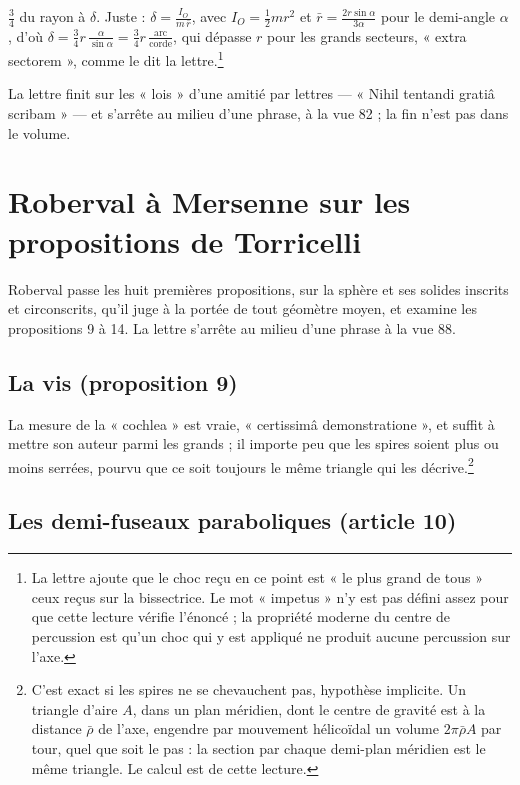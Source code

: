\documentclass[11pt,a4paper]{article}
\begin{document}
\begin{itemize}
    $\tfrac34$ du rayon à $\delta$. Juste : $\delta = \frac{I_O}{m\,\bar r}$, avec
    $I_O = \tfrac12 mr^2$ et $\bar r = \frac{2r\sin\alpha}{3\alpha}$ pour le
    demi-angle $\alpha$, d'où $\delta = \tfrac34 r\,\frac{\alpha}{\sin\alpha} =
    \tfrac34 r\,\frac{\text{arc}}{\text{corde}}$, qui dépasse $r$ pour les grands
    secteurs, « extra sectorem », comme le dit la lettre.\footnote{La lettre
    ajoute que le choc reçu en ce point est « le plus grand de tous » ceux reçus
    sur la bissectrice. Le mot « impetus » n'y est pas défini assez pour que
    cette lecture vérifie l'énoncé ; la propriété moderne du centre de percussion
    est qu'un choc qui y est appliqué ne produit aucune percussion sur l'axe.}
\end{itemize}

La lettre finit sur les « lois » d'une amitié par lettres — « Nihil tentandi
gratiâ scribam » — et s'arrête au milieu d'une phrase, à la vue 82 ; la fin n'est
pas dans le volume.

\section*{Roberval à Mersenne sur les propositions de Torricelli}

Roberval passe les huit premières propositions, sur la sphère et ses solides
inscrits et circonscrits, qu'il juge à la portée de tout géomètre moyen, et
examine les propositions 9 à 14. La lettre s'arrête au milieu d'une phrase à la
vue 88.

\subsection*{La vis (proposition 9)}

La mesure de la « cochlea » est vraie, « certissimâ demonstratione », et suffit
à mettre son auteur parmi les grands ; il importe peu que les spires soient plus
ou moins serrées, pourvu que ce soit toujours le même triangle qui les
décrive.\footnote{C'est exact si les spires ne se chevauchent pas, hypothèse
implicite. Un triangle d'aire $A$, dans un plan méridien, dont le centre de
gravité est à la distance $\bar\rho$ de l'axe, engendre par mouvement hélicoïdal
un volume $2\pi\bar\rho A$ par tour, quel que soit le pas : la section par chaque
demi-plan méridien est le même triangle. Le calcul est de cette lecture.}

\subsection*{Les demi-fuseaux paraboliques (article 10)}
\end{document}

